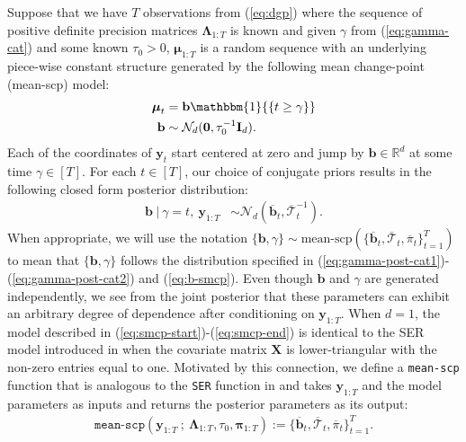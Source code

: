 Suppose that we have $T$ observations from (\ref{eq:dgp}) where the sequence of positive definite precision matrices $\boldsymbol{\Lambda}_{1:T}$ is known and given $\gamma$ from (\ref{eq:gamma-cat}) and some known $\tau_0 > 0$, $\boldsymbol{\mu}_{1:T}$ is a random sequence with an underlying piece-wise constant structure generated by the following mean change-point (mean-scp) model:
\begin{align} \label{eq:smcp-start}
    \boldsymbol{\mu}_t &= \mathbf{b}\mathbbm{1}{\left\{t\geq \gamma \right\}} \\
    \mathbf{b} &\sim \mathcal{N}_d(\mathbf{0},\tau_0^{-1} \mathbf{I}_d).    
    \label{eq:smcp-end}
\end{align}
Each of the coordinates of $\mathbf{y}_{t}$ start centered at zero and jump by $\mathbf{b}\in\mathbb{R}^d$ at some time $\gamma \in [T]$. For each $t \in [T]$, our choice of conjugate priors results in the following closed form posterior distribution:
\begin{align}
    \mathbf{b} \:|\: \gamma = t, \: \mathbf{y}_{1:T} &\sim \mathcal{N}_d\left(\overline{\mathbf{b}}_{t}, \overline{\boldsymbol{\mathcal{T}}}_{t}^{-1}\right) \label{eq:b-smcp}. 
\end{align}
When appropriate, we will use the notation $\{\mathbf{b},\gamma\} \sim \text{mean-scp}(\{\overline{\mathbf{b}}_t, \overline{\boldsymbol{\mathcal{T}}}_t, \overline{\pi}_t\}_{t=1}^T)$ to mean that $\{\mathbf{b}, \gamma\}$ follows the distribution specified in (\ref{eq:gamma-post-cat1})-(\ref{eq:gamma-post-cat2}) and (\ref{eq:b-smcp}). Even though $\mathbf{b}$ and $\gamma$ are generated independently, we see from the joint posterior that these parameters can exhibit an arbitrary degree of dependence after conditioning on $\mathbf{y}_{1:T}$. When $d = 1$, the model described in (\ref{eq:smcp-start})-(\ref{eq:smcp-end}) is identical to the SER model introduced in \cite{Wang20} when the covariate matrix $\mathbf{X}$ is lower-triangular with the non-zero entries equal to one. Motivated by this connection, we define a \texttt{mean-scp} function that is analogous to the \texttt{SER} function in \cite{Wang20} and takes $\mathbf{y}_{1:T}$ and the model parameters as inputs and returns the posterior parameters as its output: 
\begin{align}\label{eq:mean-scp-fn}
    \texttt{mean-scp}\left(\mathbf{y}_{1:T} \:;\: \boldsymbol{\Lambda}_{1:T}, \tau_0, \boldsymbol{\pi}_{1:T}\right) := \{\overline{\mathbf{b}}_t, \overline{\boldsymbol{\mathcal{T}}}_t, \overline{\pi}_t\}_{t=1}^T.
\end{align}

